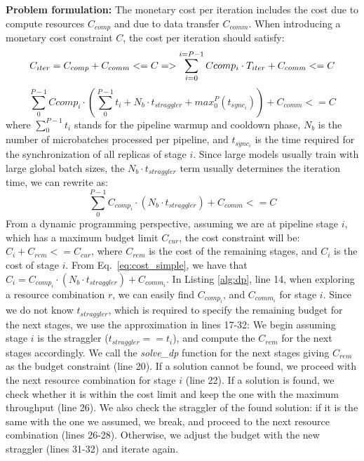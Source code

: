 \textbf{Problem formulation:} The monetary cost per iteration includes the cost due to compute resources $C_{comp}$ and due to data transfer $C_{comm}$. When introducing a monetary cost constraint $C$, the cost per iteration should satisfy:
$$
C_{iter} = C_{comp} + C_{comm} <= C
=>\sum_{i=0}^{i=P-1}{Ccomp_i}\cdot T_{iter} + C_{comm} <= C  \newline
$$
$$
\sum_{0}^{P-1}{Ccomp_i}\cdot (\sum_0^{P-1}{t_i} + N_b \cdot t_{straggler} + max_0^P(t_{sync_i}) ) + C_{comm} <= C 
$$ where $\sum_0^{P-1}{t_i}$ stands for the pipeline warmup and cooldown phase, $N_b$ is the number of microbatches processed per pipeline, and $t_{sync_i}$ is the time required for the synchronization of all replicas of stage $i$. Since large models usually train with large global batch sizes, the $N_b \cdot t_{straggler}$ term usually determines the iteration time, we can rewrite as:
\begin{equation}\label{eq:cost_simple}
\sum_{0}^{P-1}{C_{{comp}_i}}\cdot (N_b \cdot t_{straggler})  + C_{comm} <= C 
\end{equation}
From a dynamic programming perspective, assuming we are at pipeline stage $i$, which has a maximum budget limit $C_{cur}$, the cost constraint will be: $C_i + C_{rem} <= C_{cur}$, where $C_{rem}$ is the cost of the remaining stages, and $C_i$ is the cost of stage $i$. From Eq.~\ref{eq:cost_simple}, we have that $C_i = C_{comp_i} \cdot (N_b \cdot t_{straggler})  + C_{comm_i}
$.
In Listing \ref{alg:dp}, line 14, when exploring a resource combination $r$, we can easily find $C_{comp_i}$, and $C_{comm_i}$ for stage $i$. Since we do not know $t_{straggler}$, which is required to specify the remaining budget for the next stages, we use the approximation in lines 17-32: We begin assuming stage $i$ is the straggler ($t_{straggler}==t_i$), and compute the $C_{rem}$ for the next stages accordingly. We call the \textit{solve\_dp} function for the next stages giving $C_{rem}$ as the budget constraint (line 20). If a solution cannot be found, we proceed with the next resource combination for stage $i$ (line 22). If a solution is found,  we check whether it is within the cost limit and keep the one with the maximum throughput (line 26). We also check the straggler of the found solution: if it is the same with the one we assumed, we break, and proceed to the next resource combination (lines 26-28). Otherwise, we adjust the budget with the new straggler (lines 31-32) and iterate again.



